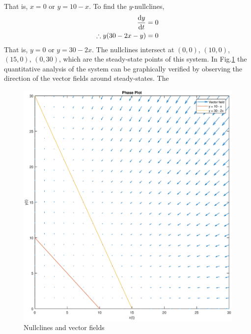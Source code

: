 \documentclass[12pt,1in]{article}
\newenvironment{Example}[2][Example]{\begin{trivlist}
		\item[\hskip \labelsep {\bfseries #1}\hskip \labelsep {\bfseries #2.}]}{\end{trivlist}}
\begin{document}
\begin{Example}{1}
\begin{align*}
\end{align*}
That is, $x = 0$ or $y = 10 - x$. 
To find the $y$-nullclines,
\begin{align*}
\derivative{y}{t} &= 0\\
\therefore y(30 - 2x - y) &= 0
\end{align*}
That is, $y = 0$ or $y = 30 - 2x$. 
The nullclines intersect at $(0,0)$, $(10,0)$, $(15,0)$, $(0,30)$, which are the steady-state points of this system. In Fig.\ref{fig:example1} the quantitative analysis of the system can be graphically verified by observing the direction of the vector fields around steady-states. 
The 
\begin{figure}[H]
	\centering
	\includegraphics[width=\linewidth,height=.85\linewidth]{Figures/example_1}
	\caption{Nullclines and vector fields}
	\label{fig:example1}
\end{figure}

\end{Example}
\end{document}

